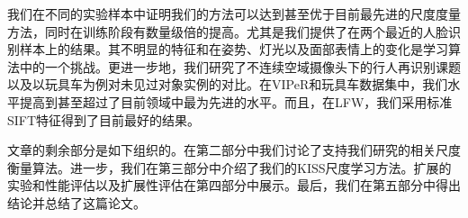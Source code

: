 我们在不同的实验样本中证明我们的方法可以达到甚至优于目前最先进的尺度度量方法，同时在训练阶段有数量级倍的提高。尤其是我们提供了在两个最近的人脸识别样本上的结果。其不明显的特征和在姿势、灯光以及面部表情上的变化是学习算法中的一个挑战。更进一步地，我们研究了不连续空域摄像头下的行人再识别课题以及以玩具车为例对未见过对象实例的对比。在VIPeR和玩具车数据集中，我们水平提高到甚至超过了目前领域中最为先进的水平。而且，在LFW，我们采用标准SIFT特征得到了目前最好的结果。

文章的剩余部分是如下组织的。在第二部分中我们讨论了支持我们研究的相关尺度衡量算法。进一步，我们在第三部分中介绍了我们的KISS尺度学习方法。扩展的实验和性能评估以及扩展性评估在第四部分中展示。最后，我们在第五部分中得出结论并总结了这篇论文。
